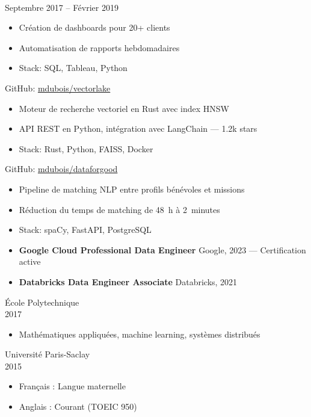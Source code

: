 {\\ Septembre 2017 -- Février 2019}
\begin{itemize}
    \item Création de dashboards pour 20+ clients
    \item Automatisation de rapports hebdomadaires
    \item Stack: SQL, Tableau, Python
\end{itemize}


    {GitHub: \href{https://github.com/mdubois/vectorlake}{mdubois/vectorlake}}
\begin{itemize}
    \item Moteur de recherche vectoriel en Rust avec index HNSW
    \item API REST en Python, intégration avec LangChain — 1.2k stars
    \item Stack: Rust, Python, FAISS, Docker
\end{itemize}

    {GitHub: \href{https://github.com/mdubois/dataforgood}{mdubois/dataforgood}}
\begin{itemize}
    \item Pipeline de matching NLP entre profils bénévoles et missions
    \item Réduction du temps de matching de 48~h à 2~minutes
    \item Stack: spaCy, FastAPI, PostgreSQL
\end{itemize}


\begin{itemize}
    \item \textbf{Google Cloud Professional Data Engineer}
          Google, 2023 — Certification active

    \item \textbf{Databricks Data Engineer Associate}
          Databricks, 2021
\end{itemize}


    {École Polytechnique \\ 2017}
\begin{itemize}
    \item Mathématiques appliquées, machine learning, systèmes distribués
\end{itemize}

    {Université Paris-Saclay \\ 2015}


\begin{itemize}
    \item Français : Langue maternelle
    \item Anglais : Courant (TOEIC 950)
\end{itemize}


